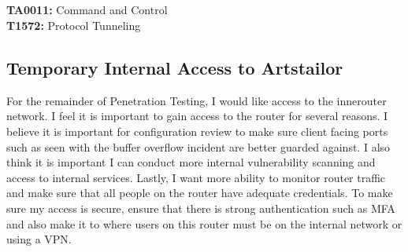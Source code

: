 \documentclass[notitlepage]{article}
\begin{document}
    \subsection*{}
    \indent\textbf{TA0011:} Command and Control \\
    \indent\indent\textbf{T1572:} Protocol Tunneling \\

    \subsection{Temporary Internal Access to Artstailor}
    For the remainder of Penetration Testing, I would like access to the innerouter network. I feel it is important to gain access to the router for several reasons.
    I believe it is important for configuration review to make sure client facing ports such as seen with the buffer overflow incident are better guarded against. I also think
    it is important I can conduct more internal vulnerability scanning and access to internal services. Lastly, I want more ability to monitor router traffic and make sure that
    all people on the router have adequate credentials. To make sure my access is secure, ensure that there is strong authentication such as MFA and also make it to where users on this router
    must be on the internal network or using a VPN. 
\end{document}
